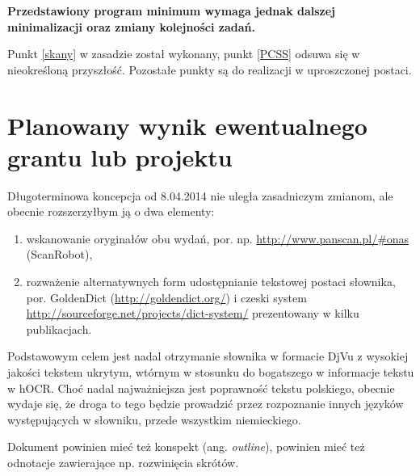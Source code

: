 \documentclass[12]{mwart}
\begin{document}
\textbf{Przedstawiony program minimum wymaga jednak dalszej minimalizacji oraz
zmiany kolejności zadań.}

Punkt \ref{skany} w zasadzie został wykonany, punkt \ref{PCSS} odsuwa
się w nieokreśloną przyszłość. Pozostałe punkty są do realizacji w
uproszczonej postaci.




\section{Planowany wynik ewentualnego grantu lub projektu}
\label{sec:planowany-wynik}

Długoterminowa koncepcja od 8.04.2014 nie uległa zasadniczym zmianom,
ale obecnie rozszerzyłbym ją o dwa elementy:
\begin{enumerate}
\item wskanowanie oryginałów obu wydań,
  por. np. \url{http://www.panscan.pl/#onas} (ScanRobot),
\item rozważenie alternatywnych form udostępnianie tekstowej postaci
  słownika, por. GoldenDict (\url{http://goldendict.org/}) i czeski
  system \url{http://sourceforge.net/projects/dict-system/}
  prezentowany w kilku publikacjach.
\end{enumerate}


Podstawowym celem jest nadal otrzymanie słownika w formacie DjVu z
wysokiej jakości tekstem ukrytym, wtórnym w stosunku do bogatszego w
informacje tekstu w hOCR. Choć nadal najważniejsza jest poprawność
tekstu polskiego, obecnie wydaje się, że droga to tego będzie
prowadzić przez rozpoznanie innych języków występujących w słowniku,
przede wszystkim niemieckiego.  

Dokument powinien mieć też konspekt (ang. \textit{outline}), powinien
mieć też odnotacje zawierające np. rozwinięcia skrótów. 
\end{document}
